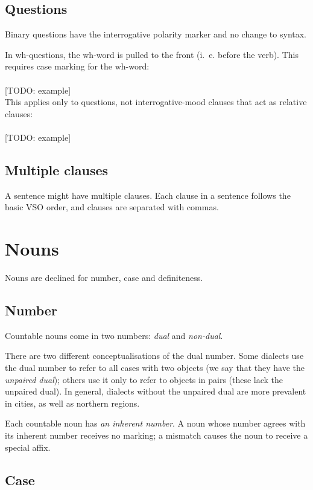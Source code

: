 \documentclass{book}
\begin{document}
\section{Questions}

Binary questions have the interrogative polarity marker and no change to syntax.

In wh-questions, the wh-word is pulled to the front (i.~e. before the verb). This requires case marking for the wh-word: \\
~\\
{}[TODO: example] \\

This applies only to questions, not interrogative-mood clauses that act as relative clauses: \\
~\\
{}[TODO: example]

\section{Multiple clauses}

A sentence might have multiple clauses. Each clause in a sentence follows the basic VSO order, and clauses are separated with commas.

\chapter{Nouns}

Nouns are declined for number, case and definiteness.

\section{Number}

Countable nouns come in two numbers: \emph{dual} and \emph{non-dual}.

There are two different conceptualisations of the dual number. Some dialects use the dual number to refer to all cases with two objects (we say that they have the \emph{unpaired dual}); others use it only to refer to objects in pairs (these lack the unpaired dual). In general, dialects without the unpaired dual are more prevalent in cities, as well as northern regions.

Each countable noun has \emph{an inherent number}. A noun whose number agrees with its inherent number receives no marking; a mismatch causes the noun to receive a special affix.

\section{Case}
\end{document}
